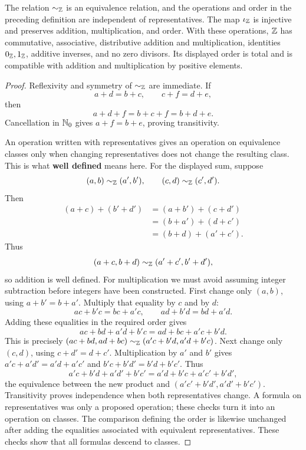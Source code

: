 \begin{proposition}
\label{prop:integer-arithmetic}
The relation \(\sim_{\mathbb{Z}}\) is an equivalence relation, and the operations and
order in the preceding definition are independent of representatives.  The
map \(\iota_{\mathbb{Z}}\) is injective and preserves addition, multiplication, and
order.  With these operations, \(\mathbb{Z}\) has commutative, associative,
distributive addition and multiplication, identities \(0_{\mathbb{Z}},1_{\mathbb{Z}}\),
additive inverses, and no zero divisors.  Its displayed order is total and
is compatible with addition and multiplication by positive elements.
\end{proposition}
\begin{proof}
Reflexivity and symmetry of \(\sim_{\mathbb{Z}}\) are immediate.  If
\[
a+d=b+c,
\qquad
c+f=d+e,
\]
then
\[
a+d+f=b+c+f=b+d+e.
\]
Cancellation in \(\mathbb{N}_0\) gives \(a+f=b+e\), proving transitivity.

An operation written with representatives gives an operation on equivalence
classes only when changing representatives does not change the resulting
class. This is what \textbf{well defined} means here. For the displayed sum,
suppose
\[
(a,b)\sim_{\mathbb{Z}}(a',b'),
\qquad
(c,d)\sim_{\mathbb{Z}}(c',d').
\]
Then
\[
\begin{aligned}
(a+c)+(b'+d')
&=(a+b')+(c+d')\\
&=(b+a')+(d+c')\\
&=(b+d)+(a'+c').
\end{aligned}
\]
Thus
\[
(a+c,b+d)\sim_{\mathbb{Z}}(a'+c',b'+d'),
\]
so addition is well defined. For multiplication we must avoid assuming
integer subtraction before integers have been constructed. First change
only $(a,b)$, using $a+b'=b+a'$. Multiply that equality by $c$ and by $d$:
\[
ac+b'c=bc+a'c,\qquad ad+b'd=bd+a'd.
\]
Adding these equalities in the required order gives
\[
ac+bd+a'd+b'c=ad+bc+a'c+b'd.
\]
This is precisely
$(ac+bd,ad+bc)\sim_{\mathbb{Z}}(a'c+b'd,a'd+b'c)$.
Next change only $(c,d)$, using $c+d'=d+c'$. Multiplication by $a'$
and $b'$ gives $a'c+a'd'=a'd+a'c'$ and
$b'c+b'd'=b'd+b'c'$. Thus
\[
a'c+b'd+a'd'+b'c'=a'd+b'c+a'c'+b'd',
\]
the equivalence between the new product and
$(a'c'+b'd',a'd'+b'c')$. Transitivity proves independence when both
representatives change. A formula on representatives was only a proposed
operation; these checks turn it into an operation on classes.
The comparison defining the order is likewise unchanged after adding the
equalities associated with equivalent representatives.  These checks show
that all formulas descend to classes.


\end{proof}
